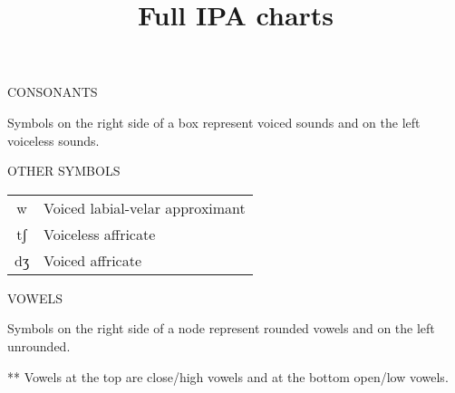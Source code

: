 \documentclass{article}
\title{Full IPA charts}
\date{}
\newcommand{\headspace}{0.4cm}
\begin{document}
  \maketitle
  CONSONANTS

  \vspace{\headspace}

  \begin{adjustbox}{width=\textwidth}
    
  \end{adjustbox}

  {\tiny *Symbols on the right side of a box represent voiced sounds and on the left voiceless sounds.}

  \vspace{2cm}

  \parbox[l]{0.5\textwidth}{
    OTHER SYMBOLS

    \vspace{\headspace}

    \begin{adjustbox}{width=0.3\textwidth}
      \begin{tabular}{c l}
        w  & Voiced labial-velar approximant \\
        tʃ & Voiceless affricate \\
        dʒ & Voiced affricate
      \end{tabular}
    \end{adjustbox}
  }
  \parbox[r]{0.5\textwidth}{
    VOWELS

    \vspace{\headspace}

    \begin{adjustbox}{width=0.3\textwidth}
      
    \end{adjustbox}
  }

  \begin{flushright}
    {\tiny *Symbols on the right side of a node represent rounded vowels and on the left unrounded.

    ** Vowels at the top are close/high vowels and at the bottom open/low vowels.}
  \end{flushright}

  {\small
    
  }
\end{document}

